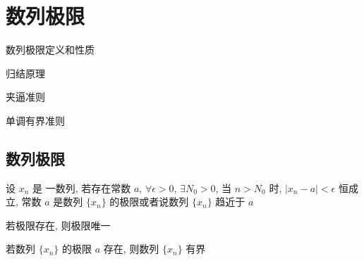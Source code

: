 
\chapter{数列极限}
\begin{introduction}
	\item 数列极限定义和性质
	\item 归结原理
	\item 夹逼准则
	\item 单调有界准则
\end{introduction}
\section{数列极限}
\begin{definition}[数列极限]
	设 $x_{n}$ 是 一数列, 若存在常数 $a$, $\forall \epsilon>0$, $\exists N_{0}>0$, 当 $n>N_{0}$ 时, $|x_{n}-a|<\epsilon$ 恒成立, 常数 $a$ 是数列 $\{x_{n}\}$ 的极限或者说数列 $\{x_{n}\}$ 趋近于 $a$
\end{definition}


\begin{property}[唯一性]
	若极限存在, 则极限唯一
\end{property}

\begin{property}[有界性]
	若数列 $\{x_{n}\}$ 的极限 $a$ 存在, 则数列 $\{x_{n}\}$ 有界
\end{property}

